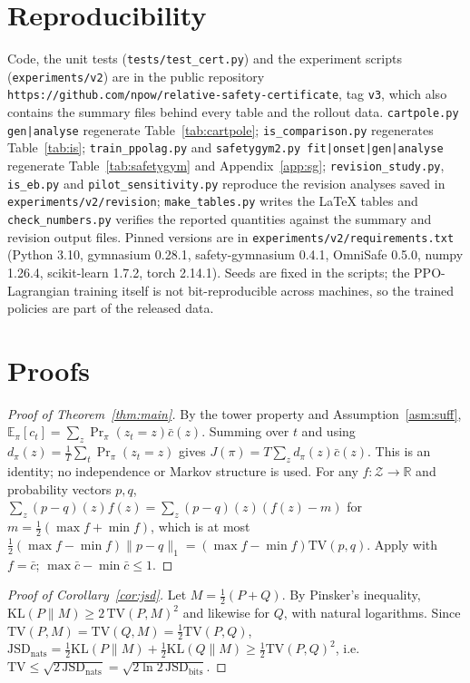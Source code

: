 \documentclass{article}
\newcommand{\TV}{\mathrm{TV}}
\newcommand{\JSD}{\mathrm{JSD}}
\begin{document}
\section{Reproducibility}
\label{sec:repro}

Code, the unit tests (\texttt{tests/test\_cert.py}) and the experiment scripts (\texttt{experiments/v2}) are in the public repository \texttt{https://github.com/npow/relative-safety-certificate}, tag \texttt{v3}, which also contains the summary files behind every table and the rollout data. \texttt{cartpole.py gen|analyse} regenerate Table~\ref{tab:cartpole}; \texttt{is\_comparison.py} regenerates Table~\ref{tab:is}; \texttt{train\_ppolag.py} and \texttt{safetygym2.py fit|onset|gen|analyse} regenerate Table~\ref{tab:safetygym} and Appendix~\ref{app:sg}; \texttt{revision\_study.py}, \texttt{is\_eb.py} and \texttt{pilot\_sensitivity.py} reproduce the revision analyses saved in \texttt{experiments/v2/revision}; \texttt{make\_tables.py} writes the \LaTeX{} tables and \texttt{check\_numbers.py} verifies the reported quantities against the summary and revision output files. Pinned versions are in \texttt{experiments/v2/requirements.txt} (Python 3.10, gymnasium 0.28.1, safety-gymnasium 0.4.1, OmniSafe 0.5.0, numpy 1.26.4, scikit-learn 1.7.2, torch 2.14.1). Seeds are fixed in the scripts; the PPO-Lagrangian training itself is not bit-reproducible across machines, so the trained policies are part of the released data.

\appendix
\section{Proofs}

\begin{proof}[Proof of Theorem~\ref{thm:main}]
By the tower property and Assumption~\ref{asm:suff}, $\mathbb E_\pi[c_t]=\sum_z\Pr_\pi(z_t=z)\bar c(z)$. Summing over $t$ and using $d_\pi(z)=\frac1T\sum_t\Pr_\pi(z_t=z)$ gives $J(\pi)=T\sum_z d_\pi(z)\bar c(z)$. This is an identity; no independence or Markov structure is used. For any $f:\mathcal Z\to\mathbb R$ and probability vectors $p,q$, $\sum_z(p-q)(z)f(z)=\sum_z(p-q)(z)(f(z)-m)$ for $m=\tfrac12(\max f+\min f)$, which is at most $\tfrac12(\max f-\min f)\|p-q\|_1=(\max f-\min f)\TV(p,q)$. Apply with $f=\bar c$; $\max\bar c-\min\bar c\le1$.
\end{proof}

\begin{proof}[Proof of Corollary~\ref{cor:jsd}]
Let $M=\tfrac12(P+Q)$. By Pinsker's inequality, $\mathrm{KL}(P\|M)\ge2\,\TV(P,M)^2$ and likewise for $Q$, with natural logarithms. Since $\TV(P,M)=\TV(Q,M)=\tfrac12\TV(P,Q)$, $\JSD_{\text{nats}}=\tfrac12\mathrm{KL}(P\|M)+\tfrac12\mathrm{KL}(Q\|M)\ge\tfrac12\TV(P,Q)^2$, i.e.\ $\TV\le\sqrt{2\,\JSD_{\text{nats}}}=\sqrt{2\ln2\,\JSD_{\text{bits}}}$.
\end{proof}
\end{document}

